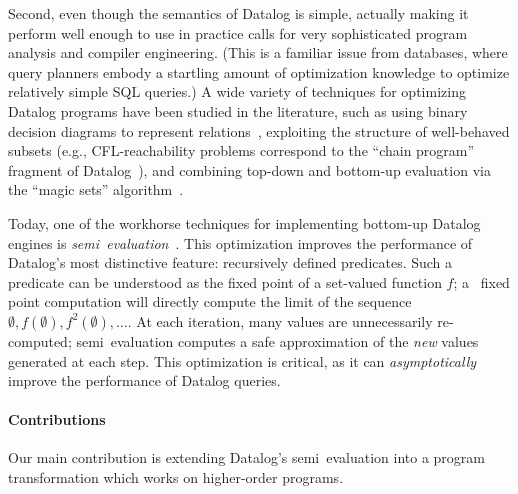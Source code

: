 Second, even though the semantics of Datalog is simple, actually
making it perform well enough to use in practice calls for very
sophisticated program analysis and compiler engineering. (This is a
familiar issue from databases, where query planners embody a startling
amount of optimization knowledge to optimize relatively simple SQL
queries.) A wide variety of techniques for optimizing Datalog programs
have been studied in the literature, such as using binary decision
diagrams to represent relations~\cite{whaley-phd}, exploiting the
structure of well-behaved subsets (e.g., CFL-reachability problems
correspond to the ``chain program'' fragment of
Datalog~\cite{chain-programs}), and combining top-down and bottom-up
evaluation via the ``magic sets'' algorithm~\cite{magic-sets}.

Today, one of the workhorse techniques for implementing bottom-up Datalog
engines is \emph{semi\naive\ evaluation}~\cite{seminaive}. This optimization
improves the performance of Datalog's most distinctive feature: recursively
defined predicates. Such a predicate can be understood as the fixed point of a
set-valued function $f$; a \naive\ fixed point computation will directly compute
the limit of the sequence $\emptyset, f(\emptyset), f^2(\emptyset), \dots$. At
each iteration, many values are unnecessarily re-computed;
semi\naive\ evaluation computes a safe approximation of the \emph{new} values
generated at each step. This optimization is critical, as it can
\emph{asymptotically} improve the performance of Datalog queries.

\paragraph{Contributions} Our main contribution is
extending Datalog's semi\naive\ evaluation into a program transformation which
works on higher-order programs. \XXX






